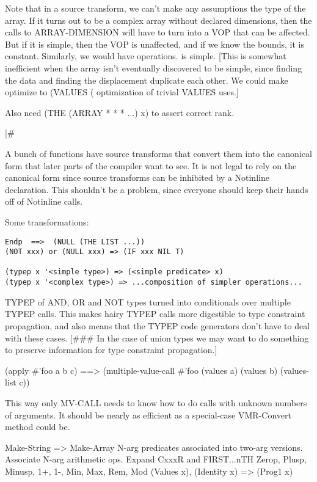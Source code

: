 Note that in a source transform, we can't make any assumptions the type of the
array.  If it turns out to be a complex array without declared dimensions, then
the calls to ARRAY-DIMENSION will have to turn into a VOP that can be affected.
But if it is simple, then the VOP is unaffected, and if we know the bounds, it
is constant.  Similarly, we would have %
operations.  %
is simple.  [This is somewhat inefficient when the array isn't eventually
discovered to be simple, since finding the data and finding the displacement
duplicate each other.  We could make %
optimize to (VALUES (%
optimization of trivial VALUES uses.]

Also need (THE (ARRAY * * * ...) x) to assert correct rank.

|\#

A bunch of functions have source transforms that convert them into the
canonical form that later parts of the compiler want to see.  It is not legal
to rely on the canonical form since source transforms can be inhibited by a
Notinline declaration.  This shouldn't be a problem, since everyone should keep
their hands off of Notinline calls.

Some transformations:
\begin{verbatim}
Endp  ==>  (NULL (THE LIST ...))
(NOT xxx) or (NULL xxx) => (IF xxx NIL T)

(typep x '<simple type>) => (<simple predicate> x)
(typep x '<complex type>) => ...composition of simpler operations...
\end{verbatim}
TYPEP of AND, OR and NOT types turned into conditionals over multiple TYPEP
calls.  This makes hairy TYPEP calls more digestible to type constraint
propagation, and also means that the TYPEP code generators don't have to deal
with these cases.  [\#\#\# In the case of union types we may want to do something
to preserve information for type constraint propagation.]


    (apply \#'foo a b c)
==>
    (multiple-value-call \#'foo (values a) (values b) (values-list c))

This way only MV-CALL needs to know how to do calls with unknown numbers of
arguments.  It should be nearly as efficient as a special-case VMR-Convert
method could be.


Make-String => Make-Array
N-arg predicates associated into two-arg versions.
Associate N-arg arithmetic ops.
Expand CxxxR and FIRST...nTH
Zerop, Plusp, Minusp, 1+, 1-, Min, Max, Rem, Mod
(Values x), (Identity x) => (Prog1 x)

